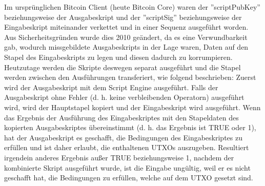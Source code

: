 Im ursprünglichen Bitcoin Client (heute Bitcoin Core) waren der ''scriptPubKey'' beziehungsweise der Ausgabeskript und der 
''scriptSig'' beziehungsweise der Eingabeskript miteinander verkettet und in einer Sequenz ausgeführt worden. Aus 
Sicherheitsgründen wurde dies 2010 geändert, da es eine Verwundbarkeit gab, wodurch missgebildete Ausgabeskripts in der 
Lage waren, Daten auf den Stapel des Eingabeskripts zu legen und diesen dadurch zu korrumpieren. Heutzutage werden die Skripte
deswegen separat ausgeführt und die Stapel werden zwischen den Ausführungen transferiert, wie folgend beschrieben: Zuerst wird
der Ausgabeskript mit dem Script Engine ausgeführt. Falls der Ausgabeskript ohne Fehler (d. h. keine verbleibenden Operatorn)
ausgeführt wird, wird der Hauptstapel kopiert und der Eingabeskript wird ausgeführt. Wenn das Ergebnis der Ausführung des 
Eingabeskriptes mit den Stapeldaten des kopierten Ausgabeskriptes übereinstimmt (d. h. das Ergebnis ist TRUE oder 1), hat der 
Ausgabeskript es geschafft, die Bedingungen des Eingabeskriptes zu erfüllen und ist daher erlaubt, die enthaltenen UTXOs
auszugeben. Resultiert irgendein anderes Ergebnis außer TRUE beziehungsweise 1, nachdem der kombinierte Skript ausgeführt wurde,
ist die Eingabe ungültig, weil er es nicht geschafft hat, die Bedingungen zu erfüllen, welche auf dem UTXO gesetzt sind.
